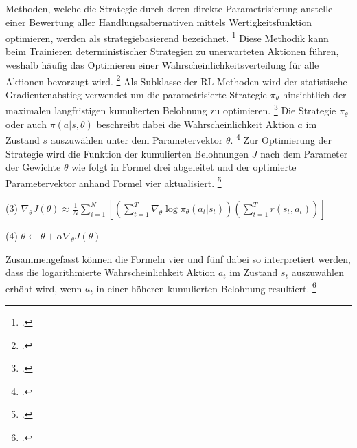 Methoden, welche die Strategie durch deren direkte Parametrisierung anstelle einer Bewertung aller Handlungsalternativen mittels Wertigkeitsfunktion optimieren, werden als strategiebasierend bezeichnet. \footcite[Vgl.][S. 2]{Zhang.2018}
Diese Methodik kann beim Trainieren deterministischer Strategien zu unerwarteten Aktionen führen, weshalb häufig das Optimieren einer Wahrscheinlichkeitsverteilung für alle Aktionen bevorzugt wird. \footcite[Vgl.][S. 3]{Ningombam.2022}
Als Subklasse der RL Methoden wird der statistische Gradientenabstieg verwendet um die parametrisierte Strategie $\pi_{\theta}$ hinsichtlich der maximalen langfristigen kumulierten Belohnung zu optimieren. \footcite[Vgl.][S. 3]{Ningombam.2022}
Die Strategie $\pi_{\theta}$ oder auch $\pi(a|s,\theta)$ beschreibt dabei die Wahrscheinlichkeit Aktion $a$ im Zustand $s$ auszuwählen unter dem Parametervektor $\theta$. \footcite[Vgl.][S. 321]{Sutton.2018}
Zur Optimierung der Strategie wird die Funktion der kumulierten Belohnungen $J$ nach dem Parameter der Gewichte $\theta$ wie folgt in Formel drei abgeleitet und der optimierte Parametervektor anhand Formel vier aktualisiert. \footcite[Vgl.][S. 6]{Wang.2020}
\begin{description}
    \item \begin{center} (3) $\nabla_{\theta}J(\theta) \approx \frac{1}{N} \sum \limits_{i=1}^{N} \left[(\sum \limits_{t=1}^{T} \nabla_{\theta}\log\pi_{\theta}(a_{t}|s_{t}))(\sum \limits_{t=1}^{T} r(s_{t},a_{t}))\right]$ \end{center}
    \item \begin{center} (4) $\theta \leftarrow \theta + \alpha\nabla_{\theta}J(\theta)$ \end{center}
\end{description}
Zusammengefasst können die Formeln vier und fünf dabei so interpretiert werden, dass die logarithmierte Wahrscheinlichkeit Aktion $a_{t}$ im Zustand $s_{t}$ auszuwählen erhöht wird, wenn $a_{t}$ in einer höheren kumulierten Belohnung resultiert. \footcite[Vgl.][S. 6]{Wang.2020}

